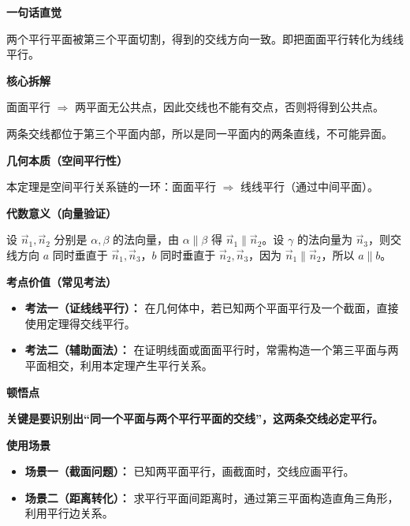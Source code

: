 \begin{explanationbox}
	\textbf{\textcolor{CExplanation}{一句话直觉}}

	两个平行平面被第三个平面切割，得到的交线方向一致。即把面面平行转化为线线平行。

	\medskip
	\textbf{\textcolor{CExplanation}{核心拆解}}
	\begin{description}[style=nextline, leftmargin=2.8em, labelsep=0.5em, itemsep=0.45em]
		\item[\textbf{要点一（平行关系传递）：}] 面面平行 $\Rightarrow$ 两平面无公共点，因此交线也不能有交点，否则将得到公共点。
		\item[\textbf{要点二（共面性质）：}] 两条交线都位于第三个平面内部，所以是同一平面内的两条直线，不可能异面。
	\end{description}

	\medskip
	\textbf{\textcolor{CExplanation}{几何本质（空间平行性）}}

	本定理是空间平行关系链的一环：面面平行 $\Rightarrow$ 线线平行（通过中间平面）。

	\medskip
	\textbf{\textcolor{CExplanation}{代数意义（向量验证）}}

	设 $\vec{n}_1,\vec{n}_2$ 分别是 $\alpha,\beta$ 的法向量，由 $\alpha\parallel\beta$ 得 $\vec{n}_1\parallel\vec{n}_2$。设 $\gamma$ 的法向量为 $\vec{n}_3$，则交线方向 $a$ 同时垂直于 $\vec{n}_1,\vec{n}_3$，$b$ 同时垂直于 $\vec{n}_2,\vec{n}_3$，因为 $\vec{n}_1\parallel\vec{n}_2$，所以 $a\parallel b$。

	\medskip
	\textbf{\textcolor{CExplanation}{考点价值（常见考法）}}
	\begin{itemize}[leftmargin=*, itemsep=0.5em, topsep=0.4em]
		\item \textbf{考法一（证线线平行）：} 在几何体中，若已知两个平面平行及一个截面，直接使用定理得交线平行。
		\item \textbf{考法二（辅助面法）：} 在证明线面或面面平行时，常需构造一个第三平面与两平面相交，利用本定理产生平行关系。
	\end{itemize}

	\medskip
	\textbf{\textcolor{CExplanation}{顿悟点}}

	\textbf{关键是要识别出“同一个平面与两个平行平面的交线”，这两条交线必定平行。}

	\medskip
	\textbf{\textcolor{CExplanation}{使用场景}}
	\begin{itemize}[leftmargin=*, itemsep=0.5em, topsep=0.4em]
		\item \textbf{场景一（截面问题）：} 已知两平面平行，画截面时，交线应画平行。
		\item \textbf{场景二（距离转化）：} 求平行平面间距离时，通过第三平面构造直角三角形，利用平行边关系。
	\end{itemize}
\end{explanationbox}
